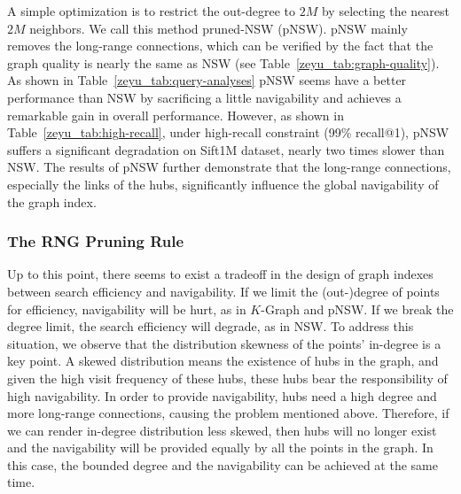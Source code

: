 \documentclass[11pt]{article}
\begin{document}
A simple optimization is to restrict the out-degree to $2M$ by selecting the nearest $2M$ neighbors.
We call this method pruned-NSW (pNSW).
pNSW mainly removes the long-range connections, which can be verified by the fact that the graph quality is nearly the same as NSW (see Table~\ref{zeyu_tab:graph-quality}).
As shown in Table~\ref{zeyu_tab:query-analyses} pNSW seems have a better performance than NSW by sacrificing a little navigability and achieves a remarkable gain in overall performance.
However, as shown in Table~\ref{zeyu_tab:high-recall}, under high-recall constraint (99\% recall@1), pNSW suffers a significant degradation on Sift1M dataset, nearly two times slower than NSW.
The results of pNSW further demonstrate that the long-range connections, especially the links of the hubs, significantly influence the global navigability of the graph index.


\subsubsection{The RNG Pruning Rule}
Up to this point, there seems to exist a tradeoff in the design of graph indexes between search efficiency and navigability.
If we limit the (out-)degree of points for efficiency, navigability will be hurt, as in $K$-Graph and pNSW.
If we break the degree limit, the search efficiency will degrade, as in NSW.
To address this situation, we observe that the distribution skewness of the points' in-degree is a key point.
A skewed distribution means the existence of hubs in the graph, and given the high visit frequency of these hubs, these hubs bear the responsibility of high navigability.
In order to provide navigability, hubs need a high degree and more long-range connections, causing the problem mentioned above.
Therefore, if we can render in-degree distribution less skewed, then hubs will no longer exist and the navigability will be provided equally by all the points in the graph.
In this case, the bounded degree and the navigability can be achieved at the same time.
\end{document}

